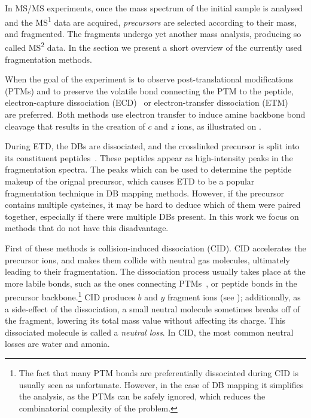 In MS/MS experiments, once the mass spectrum of the initial sample is analysed and the MS\textsuperscript{1} data are acquired, \emph{precursors} are selected according to their mass, and fragmented. The fragments undergo yet another mass analysis, producing so called MS\textsuperscript{2} data. In the section we present a short overview of the currently used fragmentation methods.

When the goal of the experiment is to observe post-translational modifications (PTMs) and to preserve the volatile bond connecting the PTM to the peptide, electron-capture dissociation (ECD)~\cite{zubarev2000electron} or electron-transfer dissociation (ETM)~\cite{syka2004peptide} are preferred. Both methods use electron transfer to induce amine backbone bond cleavage that results in the creation of \(c\) and \(z\) ions, as illustrated on .

During ETD, the DBs are dissociated, and the crosslinked precursor is split into its constituent peptides~\cite{liu2014facilitating}. These peptides appear as high-intensity peaks in the fragmentation spectra. The peaks which can be used to determine the peptide makeup of the orignal precursor, which causes ETD to be a popular fragmentation technique in DB mapping methods. However, if the precursor contains multiple cysteines, it may be hard to deduce which of them were paired together, especially if there were multiple DBs present. In this work we focus on methods that do not have this disadvantage.

First of these methods is collision-induced dissociation (CID). CID accelerates the precursor ions, and makes them collide with neutral gas molecules, ultimately leading to their fragmentation. The dissociation process usually takes place at the more labile bonds, such as the ones connecting PTMs~\cite{quan2013cid}, or peptide bonds in the precursor backbone.\footnote{The fact that many PTM bonds are preferentially dissociated during CID is usually seen as unfortunate. However, in the case of DB mapping it simplifies the analysis, as the PTMs can be safely ignored, which reduces the combinatorial complexity of the problem.} CID produces \(b\) and \(y\) fragment ions (see ); additionally, as a side-effect of the dissociation, a small neutral molecule sometimes breaks off of the fragment, lowering its total mass value without affecting its charge. This dissociated molecule is called a \emph{neutral loss}. In CID, the most common neutral losses are water and amonia.


